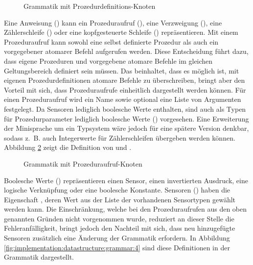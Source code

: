 \begin{figure}[h]
  
  \caption{Grammatik mit Prozedurdefinitions-Knoten}
  \label{fig:implementation:datastructure:grammar:2}
\end{figure}

Eine Anweisung () kann ein Prozeduraufruf (), eine Verzweigung (), eine Zählerschleife () oder eine kopfgesteuerte Schleife () repräsentieren. Mit einem Prozeduraufruf kann sowohl eine selbst definierte Prozedur als auch ein vorgegebener atomarer Befehl aufgerufen werden. Diese Entscheidung führt dazu, dass eigene Prozeduren und vorgegebene atomare Befehle im gleichen Geltungsbereich definiert sein müssen. Das beinhaltet, dass es möglich ist, mit eigenen Prozedurdefinitionen atomare Befehle zu überschreiben, bringt aber den Vorteil mit sich, dass Prozeduraufrufe einheitlich dargestellt werden können. Für einen Prozeduraufruf wird ein Name sowie optional eine Liste von Argumenten festgelegt. Da Sensoren lediglich boolesche Werte enthalten, sind auch als Typen für Prozedurparameter lediglich boolesche Werte () vorgesehen. Eine Erweiterung der Minisprache um ein Typsystem wäre jedoch für eine spätere Version denkbar, sodass z.~B. auch Integerwerte für Zählerschleifen übergeben werden können. Abbildung \ref{fig:implementation:datastructure:grammar:3} zeigt die Definition von  und .

\begin{figure}[h]
  
  \caption{Grammatik mit Prozeduraufruf-Knoten}
  \label{fig:implementation:datastructure:grammar:3}
\end{figure}

Boolesche Werte () repräsentieren einen Sensor, einen invertierten Ausdruck, eine logische Verknüpfung oder eine boolesche Konstante. Sensoren () haben die Eigenschaft , deren Wert aus der Liste der vorhandenen Sensortypen gewählt werden kann. Die Einschränkung, welche bei den Prozeduraufrufen aus den oben genannten Gründen nicht vorgenommen wurde, reduziert an dieser Stelle die Fehleranfälligkeit, bringt jedoch den Nachteil mit sich, dass neu hinzugefügte Sensoren zusätzlich eine Änderung der Grammatik erfordern. In Abbildung \ref{fig:implementation:datastructure:grammar:4} sind diese Definitionen in der Grammatik dargestellt.


